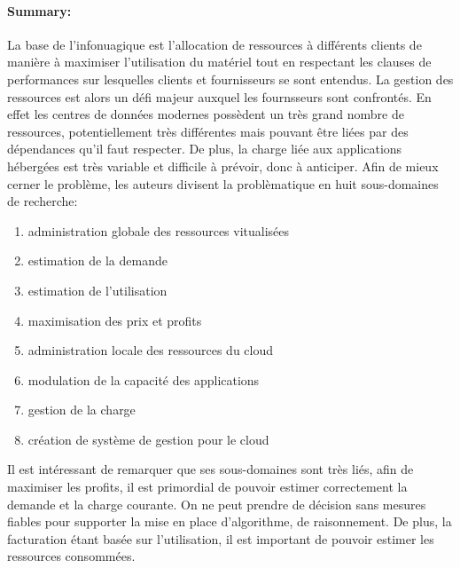 \documentclass[11pt]{article}
\begin{document}
\paragraph{Summary:}
La base de l'infonuagique est l'allocation de ressources à différents clients de manière à maximiser l'utilisation du matériel tout en respectant les clauses de 
performances sur lesquelles clients et fournisseurs se sont entendus. La gestion des ressources est alors un défi majeur auxquel les fournsseurs sont confrontés. En effet
les centres de données modernes possèdent un très grand nombre de ressources, potentiellement très différentes mais pouvant être liées par des dépendances qu'il faut
respecter. De plus, la charge liée aux applications hébergées est très variable et difficile à prévoir, donc à anticiper. Afin de mieux cerner le problème, les auteurs 
divisent la problèmatique en huit sous-domaines de recherche:
\begin{enumerate}
	\item\label{global scheduling}  administration globale des ressources vitualisées
	\item\label{resource demand}estimation de la demande
	\item\label{resource utilization}estimation de l'utilisation
	\item\label{resource pricing}maximisation des prix et profits
	\item\label{local scheduling}administration locale des ressources du cloud
	\item\label{application scaling}modulation de la capacité des applications
	\item\label{workload management}gestion de la charge
	\item\label{cloud management}création de système de gestion pour le cloud
\end{enumerate}
Il est intéressant de remarquer que ses sous-domaines sont très liés, afin de maximiser les profits, il est primordial de pouvoir estimer correctement la demande et la
charge courante. On ne peut prendre de décision sans mesures fiables pour supporter la mise en place d'algorithme, de raisonnement. De plus, la facturation étant basée 
sur l'utilisation, il est important de pouvoir estimer les ressources consommées.
\end{document}
